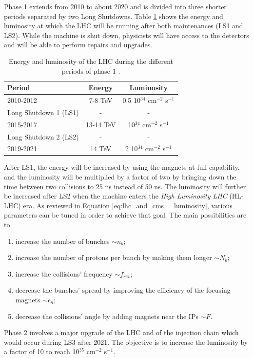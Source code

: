 		Phase 1 extends from 2010 to about 2020 and is divided into three shorter periods separated by two Long Shutdowns. Table \ref{tab:lhc_and_cms__lhc_performances} shows the energy and luminosity at which the LHC will be running after both maintenances (LS1 and LS2). While the machine is shut down, physicists will have access to the detectors and will be able to perform repairs and upgrades. \\

		\begin{table}[h!]
			\centering
			\begin{tabular}{l|c|c}
				Period & Energy & Luminosity \\ \hline
				2010-2012 & 7-8 TeV & 0.5 10$ ^{34} $ cm$ ^{-2} $ s$ ^{-1} $ \\
				Long Shutdown 1 (LS1) & - & - \\
				2015-2017 & 13-14 TeV & 10$ ^{34} $ cm$ ^{-2} $ s$ ^{-1} $ \\
				Long Shutdown 2 (LS2) & - & - \\
				2019-2021 & 14 TeV & 2 10$ ^{34} $ cm$ ^{-2} $ s$ ^{-1} $
			\end{tabular}
			\caption{Energy and luminosity of the LHC during the different periods of phase 1 \Cite{LHC_Machine}.}
			\label{tab:lhc_and_cms__lhc_performances}
		\end{table}

		After LS1, the energy will be increased by using the magnets at full capability, and the luminosity will be multiplied by a factor of two by bringing down the time between two collisions to 25 ns instead of 50 ns. The luminosity will further be increased after LS2 when the machine enters the \emph{High Luminosity LHC} (HL-LHC) era. As reviewed in Equation \ref{eq:lhc_and_cms__luminosity}, various parameters can be tuned in order to achieve that goal. The main possibilities are to \Cite{LHC_LS1, LHC_Upgrade_Scenarios}
		\begin{enumerate}
			\item increase the number of bunches $ \sim n_b $;
			\item increase the number of protons per bunch by making them longer $ \sim N_b $;
			\item increase the collisions' frequency $ \sim f_{rev} $;
			\item decrease the bunches' spread by improving the efficiency of the focusing magnets $ \sim \epsilon_n $;
			\item decrease the collisions' angle by adding magnets near the IPs $ \sim F $. \\
		\end{enumerate}

		Phase 2 involves a major upgrade of the LHC and of the injection chain which would occur during LS3 after 2021. The objective is to increase the luminosity by a factor of 10 to reach 10$ ^{35} $ cm$ ^{-2} $ s$ ^{-1} $.
